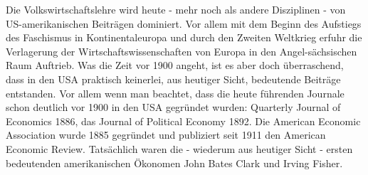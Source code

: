 Die Volkswirtschaftslehre wird heute - mehr noch als andere Disziplinen - von US-amerikanischen Beiträgen dominiert. Vor allem mit dem Beginn des Aufstiegs des Faschismus in Kontinentaleuropa und durch den Zweiten Weltkrieg erfuhr die Verlagerung der Wirtschaftswissenschaften von Europa in den Angel-sächsischen Raum Auftrieb. Was die Zeit vor 1900 angeht, ist es aber doch überraschend, dass in den USA praktisch keinerlei, aus heutiger Sicht, bedeutende Beiträge entstanden. Vor allem wenn man beachtet, dass die heute führenden Journale schon deutlich vor 1900 in den USA gegründet wurden:  Quarterly Journal of Economics 1886, das Journal of Political Economy 1892. Die American Economic Association wurde 1885 gegründet und publiziert seit 1911 den American Economic Review. Tatsächlich waren die - wiederum aus heutiger Sicht - ersten bedeutenden amerikanischen Ökonomen John Bates Clark und Irving Fisher.

